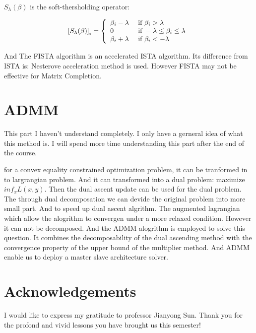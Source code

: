\documentclass[aps,letterpaper,10pt]{article}
\begin{document}
$S _ { \lambda } ( \beta )$ is the soft-thersholding operator:

\begin{align*}
\left[ S _ { \lambda } ( \beta ) \right] _ { i } = \left\{ \begin{array} { l l } { \beta _ { i } - \lambda } & { \text { if } \beta _ { i } > \lambda } \\ { 0 } & { \text { if } - \lambda \leq \beta _ { i } \leq \lambda } \\ { \beta _ { i } + \lambda } & { \text { if } \beta _ { i } < - \lambda } \end{array} \right.
\end{align*}

And The FISTA algorithm is an accelerated ISTA algorithm. Its difference from ISTA is: Nesterove acceleration method is used. However FISTA may not be effective for Matrix Completion.\vspace{3mm}



\section{ADMM}

This part I haven't understand completely. I only have a gerneral idea of what this method is. I will spend more time understanding this part after the end of the course.\vspace{3mm}

for a convex equality constrained optimization problem, it can be tranformed in to largrangian problem. And it can transformed into a dual problem: maximize $ {inf}_xL(x,y)$. Then the dual ascent update can be used for the dual problem. The through dual decomposation we can devide the original problem into more small part. And to speed up dual ascent algrithm. The augmented lagrangian which allow the alogrithm to convergen under a more relaxed condition. However it can not be decomposed. And the ADMM alogrithm is employed to solve this question. It combines the decomposability of the dual ascending method with the convergence property of the upper bound of the multiplier method. And ADMM enable us to deploy a master slave architecture solver.

\newpage
\section{Acknowledgements}
I would like to express my gratitude to professor Jianyong Sun. Thank you for the profond and vivid lessons you have brought us this semester!
\end{document}
